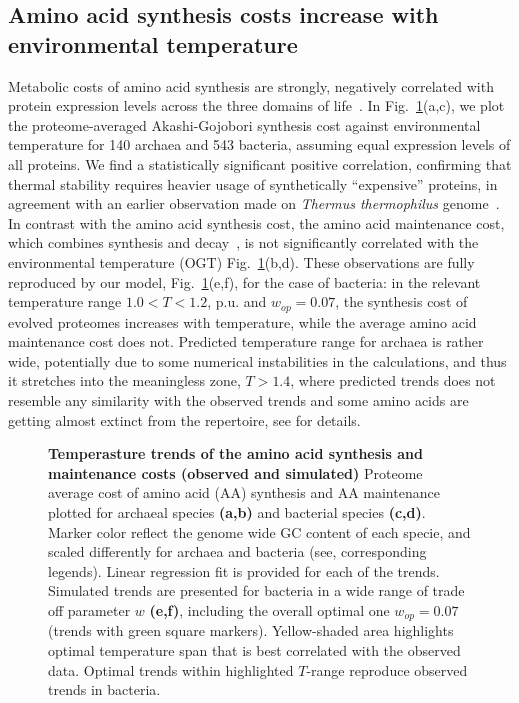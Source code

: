 \documentclass[10pt,letterpaper]{article}
\begin{document}
\subsection*{Amino acid synthesis costs increase with environmental temperature}

Metabolic costs of amino acid synthesis are strongly, negatively correlated with protein expression levels across the three domains of life~\cite{Akashi2002Metabolic,Swire2007Selection}.  In Fig.~\ref{fig:fig6}(a,c), we plot the proteome-averaged Akashi-Gojobori synthesis cost against environmental temperature for 140 archaea and 543 bacteria, assuming equal expression levels of all proteins. We find a statistically significant positive correlation, confirming that thermal stability requires heavier usage of synthetically ``expensive'' proteins, in agreement with an earlier observation made on {\it Thermus thermophilus} genome~\cite{Swire2007Selection}. In contrast with the amino acid synthesis cost, the amino acid maintenance cost, which combines synthesis and decay~\cite{Krick2014Amino}, is not significantly correlated with the environmental temperature (OGT) Fig.~\ref{fig:fig6}(b,d). These observations are fully reproduced by our model, Fig.~\ref{fig:fig6}(e,f), for the case of bacteria: in the relevant temperature range $1.0 < T < 1.2$, p.u. and $w_{op}=0.07$, the synthesis cost of evolved proteomes increases with temperature, while the average amino acid maintenance cost does not. Predicted temperature range for archaea is rather wide, potentially due to some numerical instabilities in the calculations, and thus it stretches into the meaningless zone, $T > 1.4$, where predicted trends does not resemble any similarity with the observed trends and some amino acids are getting almost extinct from the repertoire, see  for details.



\begin{figure}[h!]
\caption{
{\bf Temperasture trends of the amino acid synthesis and maintenance costs (observed and simulated)}
Proteome average cost of amino acid (AA) synthesis and AA maintenance plotted for archaeal species {\bf (a,b)} and bacterial species {\bf (c,d)}. Marker color reflect the genome wide GC content of each specie, and scaled differently for archaea and bacteria (see, corresponding legends). Linear regression fit is provided for each of the trends.
Simulated trends are presented for bacteria in a wide range of trade off parameter $w$ {\bf (e,f)}, including the overall optimal one $w_{op}=0.07$ (trends with green square markers). Yellow-shaded area highlights optimal temperature span that is best correlated with the observed data. Optimal trends within highlighted $T$-range reproduce observed trends in bacteria.
}
\label{fig:fig6}
\end{figure}
\end{document}
